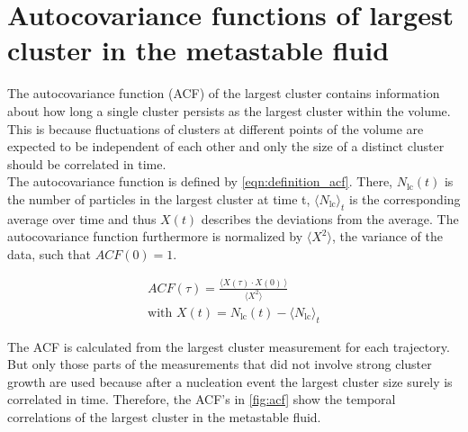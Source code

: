 \section{Autocovariance functions of largest cluster in the metastable fluid}
\label{sec:acf}
The autocovariance function (ACF) of the largest cluster contains information about how long a single cluster persists as the largest cluster within the volume. This is because fluctuations of clusters at different points of the volume are expected to be independent of each other and only the size of a distinct cluster should be correlated in time.\\

The autocovariance function is defined by \autoref{eqn:definition_acf}. There, $N_{\text{lc}}(t)$ is the number of particles in the largest cluster at time t, $\langle N_{\text{lc}} \rangle_t$ is the corresponding average over time and thus $X(t)$ describes the deviations from the average. The autocovariance function furthermore is normalized by ${ \langle X^2  \rangle }$, the variance of the data, such that $ACF(0) = 1 $.

\begin{align}
\label{eqn:definition_acf} 
ACF(\tau)=\frac{ \langle  X(\tau) \cdot  X(0) \! \: \rangle }{ \langle X^2  \rangle }\\  
\text{with } X(t)=N_{\text{lc}}(t)- \langle N_{\text{lc}} \rangle_t 
\end{align}

The ACF is calculated from the largest cluster measurement for each trajectory. But only those parts of the measurements that did not involve strong cluster growth are used because after a nucleation event the largest cluster size surely is correlated in time. Therefore, the ACF's in \autoref{fig:acf} show the temporal correlations of the largest cluster in the metastable fluid.\\

